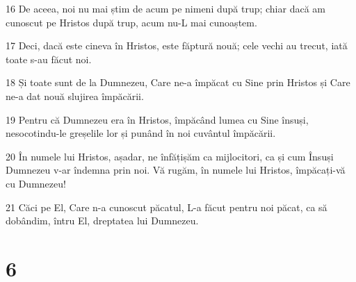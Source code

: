 \par 16 De aceea, noi nu mai știm de acum pe nimeni după trup; chiar dacă am cunoscut pe Hristos după trup, acum nu-L mai cunoaștem.
\par 17 Deci, dacă este cineva în Hristos, este făptură nouă; cele vechi au trecut, iată toate s-au făcut noi.
\par 18 Și toate sunt de la Dumnezeu, Care ne-a împăcat cu Sine prin Hristos și Care ne-a dat nouă slujirea împăcării.
\par 19 Pentru că Dumnezeu era în Hristos, împăcând lumea cu Sine însuși, nesocotindu-le greșelile lor și punând în noi cuvântul împăcării.
\par 20 În numele lui Hristos, așadar, ne înfățișăm ca mijlocitori, ca și cum Însuși Dumnezeu v-ar îndemna prin noi. Vă rugăm, în numele lui Hristos, împăcați-vă cu Dumnezeu!
\par 21 Căci pe El, Care n-a cunoscut păcatul, L-a făcut pentru noi păcat, ca să dobândim, întru El, dreptatea lui Dumnezeu.

\chapter{6}

